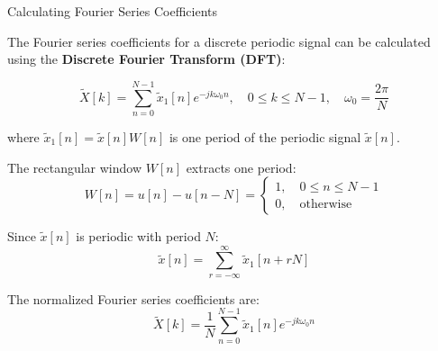 \documentclass[aspectratio=169,xcolor=dvipsnames,svgnames,x11names,fleqn]{beamer}
\begin{document}





\begin{frame}{Calculating Fourier Series Coefficients}

    \footnotesize

The Fourier series coefficients for a discrete periodic signal can be calculated using the \textbf{Discrete Fourier Transform (DFT)}:

\begin{equation}
    \tilde{X}[k] = \sum_{n=0}^{N-1} \tilde{x}_1[n] e^{-j k \omega_0 n}, \quad 0 \leq k \leq N-1, \quad \omega_0 = \frac{2\pi}{N}
\end{equation}

where $\tilde{x}_1[n] = \tilde{x}[n]W[n]$ is one period of the periodic signal $\tilde{x}[n]$.

The rectangular window $W[n]$ extracts one period:
$$
W[n] = u[n] - u[n-N] = \begin{cases}
    1, \quad 0 \leq n \leq N-1\\
    0, \quad \text{otherwise}
\end{cases}
$$

Since $\tilde{x}[n]$ is periodic with period $N$:
$$\tilde{x}[n] = \sum_{r=-\infty}^{\infty} \tilde{x}_1[n + rN]$$

The normalized Fourier series coefficients are:
$$\boxed{\tilde{X}[k] = \frac{1}{N} \sum_{n=0}^{N-1} \tilde{x}_1[n] e^{-j k \omega_0 n}}$$

\end{frame}
\end{document}
